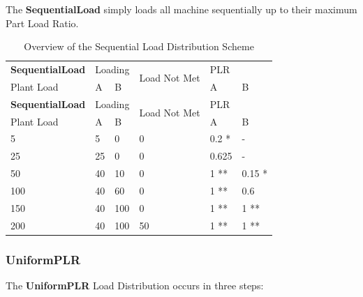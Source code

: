 The \textbf{SequentialLoad} simply loads all machine sequentially up to their maximum Part Load Ratio.

\begin{longtable}[c]{|l|p{0.5in}|p{0.5in}|l|p{0.5in}|p{0.5in}|}
    \caption{Overview of the Sequential Load Distribution Scheme}
    \label{tab:sequantial-load-overview}\\
\hline

\textbf{SequentialLoad} & \multicolumn{2}{l|}{Loading} & \multirow{2}{*}{Load Not Met} & \multicolumn{2}{l|}{PLR} \\ \cline{1-3} \cline{5-6}
Plant Load      & A             & B            &                               & A          & B           \\ \hline
\endfirsthead
\hline
\textbf{SequentialLoad} & \multicolumn{2}{l|}{Loading} & \multirow{2}{*}{Load Not Met} & \multicolumn{2}{l|}{PLR} \\ \cline{1-3} \cline{5-6}
Plant Load      & A             & B            &                               & A          & B           \\ \hline
\endhead

5               & 5             & 0            & 0                             & 0.2 *      & -           \\ \hline
25              & 25            & 0            & 0                             & 0.625      & -           \\ \hline
50              & 40            & 10           & 0                             & 1 **       & 0.15 *      \\ \hline
100             & 40            & 60           & 0                             & 1 **       & 0.6         \\ \hline
150             & 40           & 100           & 0                             & 1 **       & 1 **        \\ \hline
200             & 40           & 100           & 50                            & 1 **       & 1 **        \\ \hline
\end{longtable}


\subsubsection{UniformPLR}%
\label{ssub:uniformplr}

The \textbf{UniformPLR} Load Distribution occurs in three steps:


